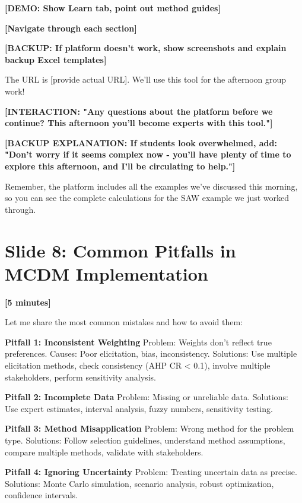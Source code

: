 \documentclass[12pt]{article}
\begin{document}
\textcolor{speakernote}{\textbf{[DEMO: Show Learn tab, point out method guides]}}

\textcolor{speakernote}{\textbf{[Navigate through each section]}}

\textcolor{speakernote}{\textbf{[BACKUP: If platform doesn't work, show screenshots and explain backup Excel templates]}}

The URL is [provide actual URL]. We'll use this tool for the afternoon group work!

\textcolor{speakernote}{\textbf{[INTERACTION: "Any questions about the platform before we continue? This afternoon you'll become experts with this tool."]}}

\textcolor{speakernote}{\textbf{[BACKUP EXPLANATION: If students look overwhelmed, add: "Don't worry if it seems complex now - you'll have plenty of time to explore this afternoon, and I'll be circulating to help."]}}

Remember, the platform includes all the examples we've discussed this morning, so you can see the complete calculations for the SAW example we just worked through.

\section*{Slide 8: Common Pitfalls in MCDM Implementation}
\textcolor{timing}{\textbf{[5 minutes]}}

Let me share the most common mistakes and how to avoid them:

\textcolor{emphasis}{\textbf{Pitfall 1: Inconsistent Weighting}}
Problem: Weights don't reflect true preferences. 
Causes: Poor elicitation, bias, inconsistency.
Solutions: Use multiple elicitation methods, check consistency (AHP CR < 0.1), involve multiple stakeholders, perform sensitivity analysis.

\textcolor{emphasis}{\textbf{Pitfall 2: Incomplete Data}}
Problem: Missing or unreliable data.
Solutions: Use expert estimates, interval analysis, fuzzy numbers, sensitivity testing.

\textcolor{emphasis}{\textbf{Pitfall 3: Method Misapplication}}
Problem: Wrong method for the problem type.
Solutions: Follow selection guidelines, understand method assumptions, compare multiple methods, validate with stakeholders.

\textcolor{emphasis}{\textbf{Pitfall 4: Ignoring Uncertainty}}
Problem: Treating uncertain data as precise.
Solutions: Monte Carlo simulation, scenario analysis, robust optimization, confidence intervals.
\end{document}
